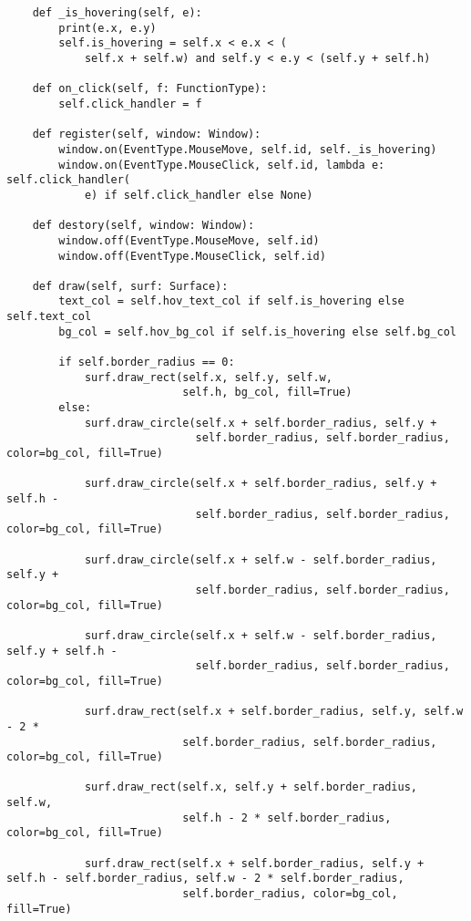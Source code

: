 \documentclass[11pt]{article}
\begin{document}
\begin{lstlisting}
    def _is_hovering(self, e):
        print(e.x, e.y)
        self.is_hovering = self.x < e.x < (
            self.x + self.w) and self.y < e.y < (self.y + self.h)

    def on_click(self, f: FunctionType):
        self.click_handler = f

    def register(self, window: Window):
        window.on(EventType.MouseMove, self.id, self._is_hovering)
        window.on(EventType.MouseClick, self.id, lambda e: self.click_handler(
            e) if self.click_handler else None)

    def destory(self, window: Window):
        window.off(EventType.MouseMove, self.id)
        window.off(EventType.MouseClick, self.id)

    def draw(self, surf: Surface):
        text_col = self.hov_text_col if self.is_hovering else self.text_col
        bg_col = self.hov_bg_col if self.is_hovering else self.bg_col

        if self.border_radius == 0:
            surf.draw_rect(self.x, self.y, self.w,
                           self.h, bg_col, fill=True)
        else:
            surf.draw_circle(self.x + self.border_radius, self.y +
                             self.border_radius, self.border_radius, color=bg_col, fill=True)

            surf.draw_circle(self.x + self.border_radius, self.y + self.h -
                             self.border_radius, self.border_radius, color=bg_col, fill=True)

            surf.draw_circle(self.x + self.w - self.border_radius, self.y +
                             self.border_radius, self.border_radius, color=bg_col, fill=True)

            surf.draw_circle(self.x + self.w - self.border_radius, self.y + self.h -
                             self.border_radius, self.border_radius, color=bg_col, fill=True)

            surf.draw_rect(self.x + self.border_radius, self.y, self.w - 2 *
                           self.border_radius, self.border_radius, color=bg_col, fill=True)

            surf.draw_rect(self.x, self.y + self.border_radius, self.w,
                           self.h - 2 * self.border_radius, color=bg_col, fill=True)

            surf.draw_rect(self.x + self.border_radius, self.y + self.h - self.border_radius, self.w - 2 * self.border_radius,
                           self.border_radius, color=bg_col, fill=True)


\end{lstlisting}
\end{document}
